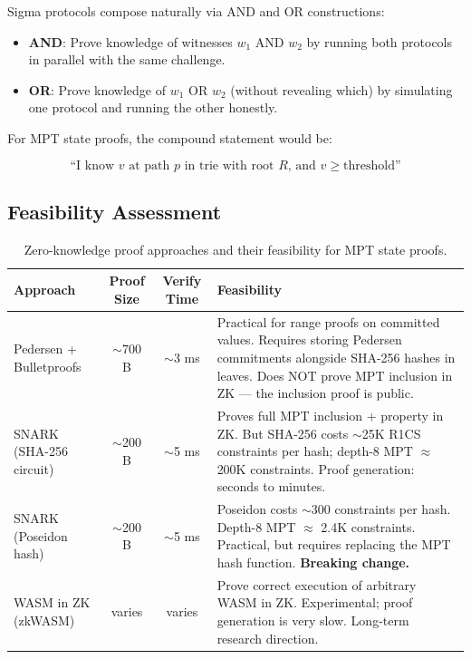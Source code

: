 \documentclass[11pt,a4paper]{article}
\begin{document}
Sigma protocols compose naturally via AND and OR constructions:

\begin{itemize}[nosep]
  \item \textbf{AND}: Prove knowledge of witnesses $w_1$ AND $w_2$ by running
    both protocols in parallel with the same challenge.
  \item \textbf{OR}: Prove knowledge of $w_1$ OR $w_2$ (without revealing
    which) by simulating one protocol and running the other honestly.
\end{itemize}

\noindent For MPT state proofs, the compound statement would be:

\[
  \text{``I know } v \text{ at path } p \text{ in trie with root } R
  \text{, and } v \geq \text{threshold''}
\]

\subsection{Feasibility Assessment}

\begin{table}[H]
\centering
\begin{tabularx}{\textwidth}{lccX}
\toprule
\textbf{Approach} & \textbf{Proof Size} & \textbf{Verify Time} & \textbf{Feasibility} \\
\midrule
Pedersen + Bulletproofs & $\sim$700 B & $\sim$3 ms &
  Practical for range proofs on committed values. Requires storing Pedersen
  commitments alongside SHA-256 hashes in leaves. Does NOT prove MPT inclusion
  in ZK --- the inclusion proof is public. \\[8pt]
SNARK (SHA-256 circuit) & $\sim$200 B & $\sim$5 ms &
  Proves full MPT inclusion + property in ZK. But SHA-256 costs $\sim$25K R1CS
  constraints per hash; depth-8 MPT $\approx$ 200K constraints. Proof
  generation: seconds to minutes. \\[8pt]
SNARK (Poseidon hash) & $\sim$200 B & $\sim$5 ms &
  Poseidon costs $\sim$300 constraints per hash. Depth-8 MPT $\approx$ 2.4K
  constraints. Practical, but requires replacing the MPT hash function.
  \textbf{Breaking change.} \\[8pt]
WASM in ZK (zkWASM) & varies & varies &
  Prove correct execution of arbitrary WASM in ZK. Experimental; proof
  generation is very slow. Long-term research direction. \\
\bottomrule
\end{tabularx}
\caption{Zero-knowledge proof approaches and their feasibility for MPT state
proofs.}
\label{tab:zk}
\end{table}
\end{document}
